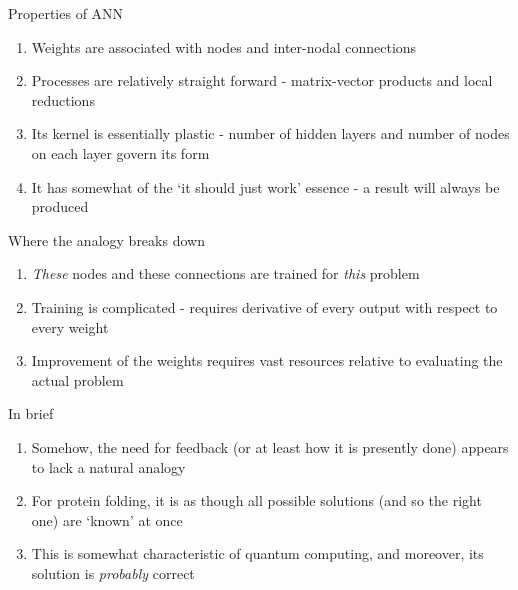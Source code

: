 \documentclass[xcolor=dvipsnames]{beamer}
\begin{document}
\begin{frame}{Properties of ANN}
  \begin{enumerate}
  \item Weights are associated with nodes and inter-nodal connections\vspace{5mm}
  \item Processes are relatively straight forward - matrix-vector products and local reductions\vspace{5mm}
  \item Its kernel is essentially plastic - number of hidden layers and number of nodes on each layer govern its form\vspace{5mm}
  \item It has somewhat of the `it should just work' essence - a result will always be produced\vspace{5mm}
  \end{enumerate}
\end{frame}


\begin{frame}{Where the analogy breaks down}
  \begin{enumerate}
  \item \emph{These} nodes and these connections are trained for \emph{this} problem\vspace{5mm}
  \item Training is complicated - requires derivative of every output with respect to every weight\vspace{5mm}
  \item Improvement of the weights requires vast resources relative to evaluating the actual problem\vspace{5mm}
  \end{enumerate}
\end{frame}


\begin{frame}{In brief}
  \begin{enumerate}
  \item Somehow, the need for feedback (or at least how it is presently done) appears to lack a natural analogy\vspace{5mm}
  \item For protein folding, it is as though all possible solutions (and so the right one) are `known' at once\vspace{5mm}
  \item This is somewhat characteristic of quantum computing, and moreover, its solution is \emph{probably} correct\vspace{5mm}
  \end{enumerate}
\end{frame}
\end{document}
